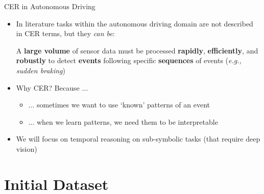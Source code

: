 \documentclass[10pt, aspectratio=169]{beamer}
\begin{document}
\begin{frame}{CER in Autonomous Driving}
    \begin{itemize}
        \setlength{\itemsep}{12pt}
        \item In literature tasks within the autonomous driving domain are not described in CER terms, but they \textit{can be}:  \\
        \vspace{0.6em}
        \begin{center}
         A \textbf{large volume} of sensor data must be processed \textbf{rapidly}, \textbf{efficiently}, and \textbf{robustly} to detect \textbf{events} following specific \textbf{sequences} of events (\textit{e.g., sudden braking})
          \end{center}
        \item \textcolor{umBlueLighter}{Why CER?} Because $\dots$
        \vspace{0.6em}
            \begin{itemize}
            \setlength{\itemsep}{4pt}
                \item $\dots$ sometimes we want to use `known' patterns of an event
                \item $\dots$ when we learn patterns, we need them to be interpretable
            \end{itemize}
        \item We will focus on temporal reasoning on sub-symbolic tasks (that require deep vision)
    \end{itemize}
\end{frame}

\section{Initial Dataset}
{
    \begin{frame}
        \sectionpage%
    \end{frame}
}
\end{document}
